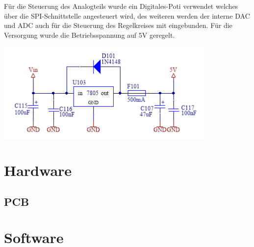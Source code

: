 \documentclass[paper=a4, 12pt]{scrreprt}
\begin{document}
	Für die Steuerung des Analogteils wurde ein Digitales-Poti verwendet welches über die SPI-Schnittstelle angesteuert wird, des weiteren werden der interne DAC und ADC auch für die Steuerung des Regelkreises mit eingebunden. Für die Versorgung wurde die Betriebsspannung auf 5V geregelt.
	\begin{adjustbox}{center,caption={VoltageRegulator 7805 },label={fig:VoltageRegulator.PNG},nofloat=figure,vspace=\bigskipamount}
		\includegraphics[height=5cm]{img/VoltageRegulator.PNG}
	\end{adjustbox}
	\newpage
	
	\section{Hardware}
		\subsection{PCB}
	\newpage
	
	\section{Software}
\end{document}
